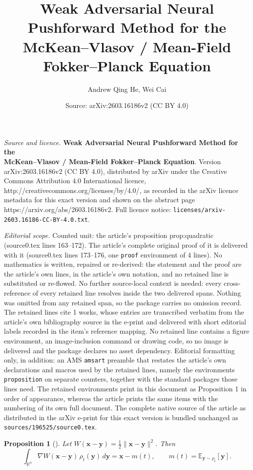 \documentclass[10pt,a4paper]{amsart}
\title{\textbf{Weak Adversarial Neural Pushforward Method for the\\ McKean--Vlasov / Mean-Field Fokker--Planck Equation}}
\author{Andrew Qing He, Wei Cai}
\date{Source: arXiv:2603.16186v2 (CC BY 4.0)}
\newtheorem{proposition}{Proposition}
\newcommand{\E}{\mathbb{E}}
\newcommand{\Rn}{\mathbb{R}^n}
\newcommand{\bx}{\mathbf{x}}
\newcommand{\by}{\mathbf{y}}
\begin{document}
\maketitle

\noindent\emph{Source and licence.} \textbf{Weak Adversarial Neural Pushforward Method for the\\ McKean--Vlasov / Mean-Field Fokker--Planck Equation}. Version arXiv:2603.16186v2 (CC BY 4.0), distributed by arXiv under the Creative Commons Attribution 4.0 International licence, http://creativecommons.org/licenses/by/4.0/, as recorded in the arXiv licence metadata for this exact version and shown on the abstract page https://arxiv.org/abs/2603.16186v2. Full licence notice: \texttt{licenses/arxiv-2603.16186-CC-BY-4.0.txt}.\par\smallskip

\noindent\textit{Editorial scope.} Counted unit: the article's proposition prop:quadratic (source0.tex lines 163--172). The article's complete original proof of it is delivered with it (source0.tex lines 173--176, one \texttt{proof} environment of 4 lines). No mathematics is written, repaired or re-derived: the statement and the proof are the article's own lines, in the article's own notation, and no retained line is substituted or re-flowed.  No further source-local context is needed: every cross-reference of every retained line resolves inside the two delivered spans.  Nothing was omitted from any retained span, so the package carries no omission record.  The retained lines cite 1 works, whose entries are transcribed verbatim from the article's own bibliography source in the e-print and delivered with short editorial labels recorded in the item's reference mapping.  No retained line contains a figure environment, an image-inclusion command or drawing code, so no image is delivered and the package declares no asset dependency.  Editorial formatting only, in addition: an AMS \texttt{amsart} preamble that restates the article's own declarations and macros used by the retained lines, namely the environments \texttt{proposition} on separate counters, together with the standard packages those lines need.  The retained environments print in this document as Proposition 1 in order of appearance, whereas the article prints the same items with the numbering of its own full document.  The complete native source of the article as distributed in the arXiv e-print for this exact version is bundled unchanged as \texttt{sources/196525/source0.tex}.
\begin{proposition}[\cite{McCann1997}]
\label{prop:quadratic}
Let $W(\bx-\by)=\frac{1}{2}\|\bx-\by\|^2$. Then
\begin{equation}
  \int_{\Rn}\nabla W(\bx-\by)\,\rho_t(\by)\,d\by
  = \bx - m(t),
  \qquad m(t)=\E_{\by\sim\rho_t}[\by].
  \label{eq:quadreduction}
\end{equation}
\end{proposition}
\end{document}
